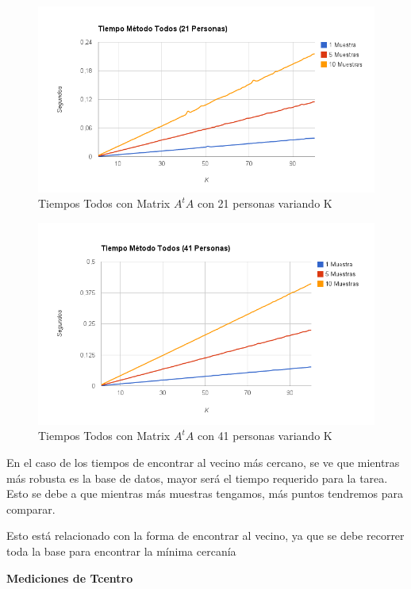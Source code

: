 \begin{figure}[H]
\includegraphics[width=1\textwidth]{img/image5.png}
     \caption{Tiempos Todos con Matrix $A^tA$ con 21 personas variando K}
\end{figure}

\begin{figure}[H]
\includegraphics[width=1\textwidth]{img/image6.png}
     \caption{Tiempos Todos con Matrix $A^tA$ con 41 personas variando K}
\end{figure}

En el caso de los tiempos de encontrar al vecino más cercano, se ve que mientras m\'as robusta es la base de datos, mayor será el tiempo requerido para la tarea. Esto se debe a que mientras m\'as muestras tengamos, m\'as puntos tendremos para comparar.

Esto est\'a relacionado con la forma de encontrar al vecino, ya que se debe recorrer toda la base para encontrar la m\'inima cercan\'ia

\textbf{Mediciones de Tcentro }

